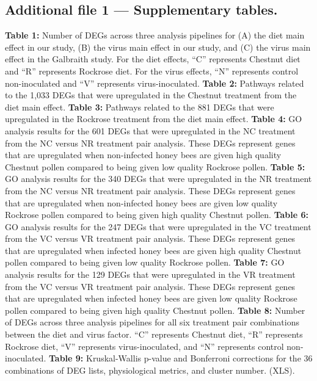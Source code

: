 \documentclass{bmcart}
\begin{document}
\begin{linenumbers}
\begin{backmatter}
  \subsection*{Additional file 1 --- Supplementary tables.}
    \textbf{Table 1:} Number of DEGs across three analysis pipelines for (A) the diet main effect in our study, (B) the virus main effect in our study, and (C) the virus main effect in the Galbraith study. For the diet effects, ``C'' represents Chestnut diet and ``R'' represents Rockrose diet. For the virus effects, ``N'' represents control non-inoculated and ``V'' represents virus-inoculated.
    \textbf{Table 2:} Pathways related to the 1,033 DEGs that were upregulated in the Chestnut treatment from the diet main effect.
    \textbf{Table 3:} Pathways related to the 881 DEGs that were upregulated in the Rockrose treatment from the diet main effect.
    \textbf{Table 4:} GO analysis results for the 601 DEGs that were upregulated in the NC treatment from the NC versus NR treatment pair analysis. These DEGs represent genes that are upregulated when non-infected honey bees are given high quality Chestnut pollen compared to being given low quality Rockrose pollen.
    \textbf{Table 5:} GO analysis results for the 340 DEGs that were upregulated in the NR treatment from the NC versus NR treatment pair analysis. These DEGs represent genes that are upregulated when non-infected honey bees are given low quality Rockrose pollen compared to being given high quality Chestnut pollen.
    \textbf{Table 6:} GO analysis results for the 247 DEGs that were upregulated in the VC treatment from the VC versus VR treatment pair analysis. These DEGs represent genes that are upregulated when infected honey bees are given high quality Chestnut pollen compared to being given low quality Rockrose pollen.
    \textbf{Table 7:} GO analysis results for the 129 DEGs that were upregulated in the VR treatment from the VC versus VR treatment pair analysis. These DEGs represent genes that are upregulated when infected honey bees are given low quality Rockrose pollen compared to being given high quality Chestnut pollen.
    \textbf{Table 8:} Number of DEGs across three analysis pipelines for all six treatment pair combinations between the diet and virus factor. ``C'' represents Chestnut diet, ``R'' represents Rockrose diet, ``V'' represents virus-inoculated, and ``N'' represents control non-inoculated.
    \textbf{Table 9:} Kruskal-Wallis p-value and Bonferroni corrections for the 36 combinations of DEG lists, physiological metrics, and cluster number. (XLS).


\end{backmatter}
\end{linenumbers}
\end{document}
